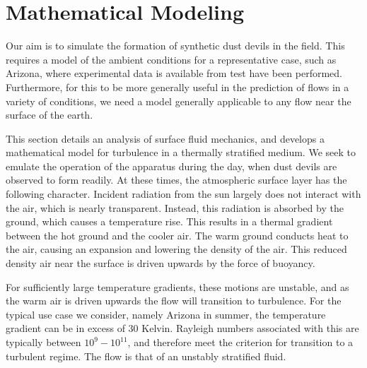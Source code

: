 \section{Mathematical Modeling}
\label{sec:mathmodel}


%
%

Our aim is to simulate the formation of synthetic dust devils in the
field. This requires a model of the ambient conditions for a
representative case, such as Arizona, where experimental data is
available from test have been performed. Furthermore, for this to be
more generally useful in the prediction of flows in a variety of
conditions, we need a model generally applicable to any flow near the
surface of the earth.  

This section details an analysis of surface fluid mechanics, and
develops a mathematical model for turbulence in a thermally stratified
medium. We seek to emulate the operation of the apparatus during the day, 
when dust devils are observed to form readily. 
At these times, the atmospheric surface layer has the following character. 
Incident radiation from the sun largely does not interact with the
air, which is nearly transparent. Instead, this radiation is absorbed by
the ground, which causes a temperature rise. This results in a thermal
gradient between the hot ground and the cooler air. The warm ground
conducts heat to the air, causing an expansion and lowering the density
of the air. This reduced density air near the surface is driven upwards
by the force of buoyancy.  

For sufficiently large temperature gradients, these motions are
unstable, and as the warm air is driven upwards the flow will transition
to turbulence. For the typical use case we consider, namely Arizona in
summer, the temperature gradient can be in excess of 30 Kelvin. 
Rayleigh numbers associated with this are typically between $10^{9} -
10^{11}$, and therefore meet the criterion for transition to a turbulent
regime. The flow is that of an unstably stratified fluid. 

